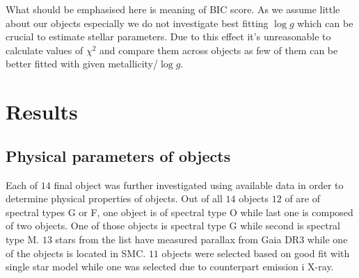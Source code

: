 \documentclass{pracalicmgr}
\begin{document}
What should be emphasised here is meaning of BIC score. As we assume little about our objects especially we do not investigate best fitting 
$\log{g}$ which can be crucial to estimate stellar parameters. Due to this effect it's unreasonable to calculate values of $\chi^2$ and compare them 
across objects as few of them can be better fitted with given metallicity/$\log{g}$.
\chapter{Results}
\section{Physical parameters of objects}
Each of $14$ final object was further investigated using available data in order to determine physical properties of objects.
Out of all $14$ objects $12$ of are of spectral types G or F, one object is of spectral type O while last one is composed of two objects. One of those objects is spectral type G while 
second is spectral type M. $13$ stars from the list have measured parallax from Gaia DR3 while one of the objects is located in SMC.
$11$ objects were selected based on good fit with single star model while one was selected due to counterpart emission i X-ray.
\end{document}

